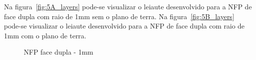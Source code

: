 \begin{figure}[htb!]
{		\label{fig:4B_layers}}
\end{figure}

Na figura~\ref{fig:5A_layers} pode-se visualizar o leiaute desenvolvido para a NFP de face dupla com raio de 1mm sem o plano de terra. Na figura~\ref{fig:5B_layers} pode-se visualizar o leiaute desenvolvido para a NFP de face dupla com raio de 1mm com o plano de terra. 
\begin{figure}[htb!]
	\centering
 	\caption{NFP face dupla - 1mm}
\end{figure}

